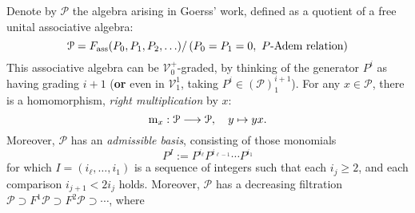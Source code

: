 \documentclass[11pt]{amsart}
\theoremstyle{plain}
\theoremstyle{definition}
\renewcommand{\to}{\longrightarrow}
\newcommand{\scrL}{\mathscr{L}}
\newcommand{\scrC}{\mathscr{C}}
\newcommand{\calW}{\mathcal{W}}
\newcommand{\calU}{\mathcal{U}}
\newcommand{\calP}{\mathcal{P}}
\newcommand{\calV}{\mathcal{V}}
\theoremstyle{plain}
\newcommand{\Palg}{{\calP}}
\newcommand{\LieOperad}{{\scrL}}
\newcommand{\vect}[2]{\calV^{#1}_{#2}}
\newcommand{\algs}{{\scrC\!\textit{om}}}
\begin{document}
\begin{Constructing (co)homotopy operations}
%
%
\begin{shaded}\tiny
Denote by $\Palg$ the algebra arising in Goerss' work, defined as a quotient of a free unital associative algebra:
\[\Palg=F_{\textup{ass}}(P_0,P_1,P_2,\ldots)/\left(P_0=P_1=0,\ \textup{$P$-Adem relation}\right)\]
This associative algebra can be $\vect{+}{0}$-graded, by thinking of the generator $P^i$ as having grading $i+1$ (\textbf{or} even in $\vect{1}{1}$, taking $P^i\in(\Palg)^{i+1}_1$). For any $x\in\Palg$, there is a homomorphism, \emph{right multiplication} by $x$:
\[\textup{m}_x:\Palg\to \Palg,\quad y\mapsto yx.\]
Moreover, $\Palg$ has an \emph{admissible basis}, consisting of those monomials
\[P^I:=P^{i_\ell}P^{i_{\ell-1}}\cdots P^{i_1}\]
for which $I=(i_\ell,\ldots,i_1)$ is a sequence of integers such that each $i_j\geq2$, and  each comparison $i_{j+1}< 2i_j$ holds. Moreover, $\Palg$ has a decreasing filtration $\Palg\supset F^1\Palg\supset F^2\Palg\supset\cdots $, where

\end{shaded}
\end{Constructing (co)homotopy operations}
\end{document}
